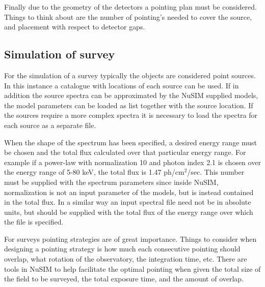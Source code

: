 Finally due to the geometry of the detectors a pointing plan must be considered. Things to think about are the number of pointing's needed to cover the source, and placement with respect to detector gaps.

\subsection{Simulation of survey}
For the simulation of a survey typically the objects are considered point sources. In this instance a catalogue with locations of each source can be used. If in addition the source spectra can be approximated by the NuSIM supplied models, the model parameters can be loaded as list together with the source location. If the sources require a more complex spectra it is necessary to load the spectra for each source as a separate file.

When the shape of the spectrum has been specified, a desired energy range must be chosen and the total flux calculated over that particular energy range. For example if a power-law with normalization 10 and photon index 2.1 is chosen over the energy range of 5-80 keV, the total flux is 1.47 ph/cm$^2$/sec. This number must be supplied with the spectrum parameters since inside NuSIM, normalization is not an input parameter of the models, but is instead contained in the total flux. In a similar way an input spectral file need not be in absolute units, but should be supplied with the total flux of the energy range over which the file is specified.

For surveys pointing strategies are of great importance. Things to consider when designing a pointing strategy is how much each consecutive pointing should overlap, what rotation of the observatory, the integration time, etc. There are tools in NuSIM to help facilitate the optimal pointing when given the total size of the field to be surveyed, the total exposure time, and the amount of overlap.

%
